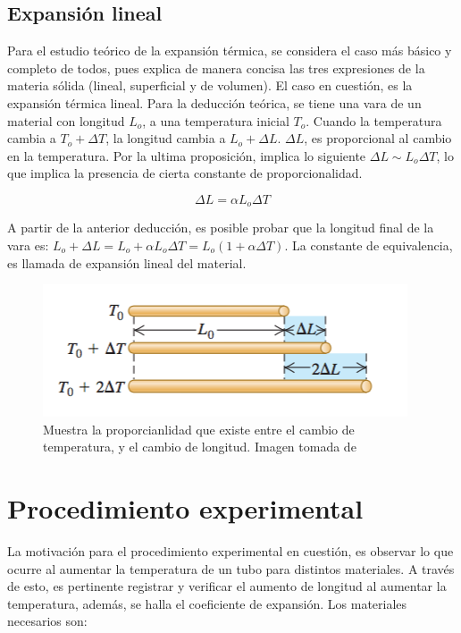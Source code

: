 \documentclass[DIV=calc, paper=a4, fontsize=11pt, twocolumn, spanish]{scrartcl}	 %
\begin{document}
\subsection*{Expansión lineal}

Para el estudio teórico de la expansión térmica, se considera el caso más básico y completo de todos, pues explica de manera concisa las tres expresiones de la materia sólida (lineal, superficial y de volumen). El caso en cuestión, es la expansión térmica lineal. Para la deducción teórica, se tiene una vara de un material con longitud $L_o$, a una temperatura inicial $T_o$. Cuando la temperatura cambia a $T_o + \Delta T$, la longitud cambia a $L_o + \Delta L$. $\Delta L$, es proporcional al cambio en la temperatura. Por la ultima proposición, implica lo siguiente $\Delta L \sim L_o \Delta T$, lo que implica la presencia de cierta constante de proporcionalidad. 

$$\Delta L = \alpha L_o \Delta T$$

A partir de la anterior deducción, es posible probar que la longitud final de la vara es: $L_o + \Delta L = L_o + \alpha L_o \Delta T = L_o(1 + \alpha \Delta T)$. La constante de equivalencia, es llamada de expansión lineal del material.

\begin{figure}[htbp]
\centering
	\includegraphics[scale=1]{data/img/figure01}
	\caption{Muestra la proporcianlidad que existe entre el cambio de temperatura, y el cambio de longitud. Imagen tomada de \cite{young2011sears}}
\end{figure}

\newpage

\section*{Procedimiento experimental}

La motivación para el procedimiento experimental en cuestión, es observar lo que ocurre al aumentar la temperatura de un tubo para distintos materiales. A través de esto, es pertinente registrar y verificar el aumento de longitud al aumentar la temperatura, además, se halla el coeficiente de expansión. Los materiales necesarios son:
\end{document}
